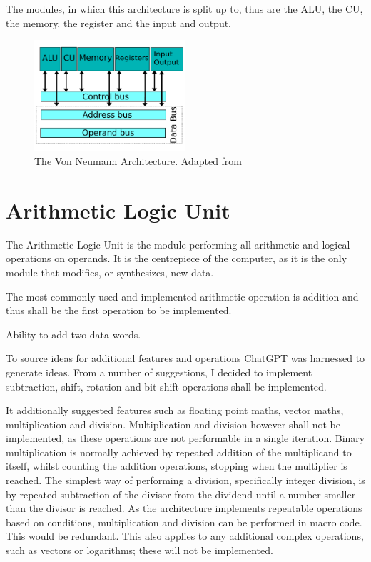 The modules, in which this architecture is split up to, thus are the ALU, the CU, the memory, the register
and the input and output.
\begin{figure}[H]
  \begin{center}
    \includegraphics[width=0.5\textwidth]{figures/VNA-Adapted}
  \end{center}
  \caption{The Von Neumann Architecture. Adapted from \cite{fig-vna}}\label{fig:vna-adapted}
\end{figure}

\section{Arithmetic Logic Unit}
The Arithmetic Logic Unit is the module performing all arithmetic and logical operations on operands. It
is the centrepiece of the computer, as it is the only module that modifies, or synthesizes, new data.

The most commonly used and implemented arithmetic operation is addition and thus shall be the first operation to be implemented.
\begin{turing-requirement}
  Ability to add two data words.
\end{turing-requirement}

To source ideas for additional features and operations ChatGPT \cite{chatgptalu} was harnessed to generate ideas. From a number of suggestions, I decided to implement subtraction, shift, rotation and bit shift operations shall be implemented. 

It additionally suggested features such as floating point maths, vector maths, multiplication and division. Multiplication and division however shall not be implemented, as these operations are not performable in a single iteration. Binary multiplication is normally achieved by repeated addition of the multiplicand to itself, whilst counting the addition operations, stopping when the multiplier is reached. The simplest way of performing a division, specifically integer division, is by repeated subtraction of the divisor from the dividend until a number smaller than the divisor is reached. As the architecture implements repeatable operations based on conditions, multiplication and division can be performed in macro code. This would be redundant. This also applies to any additional complex operations, such as vectors or logarithms; these will not be implemented.


